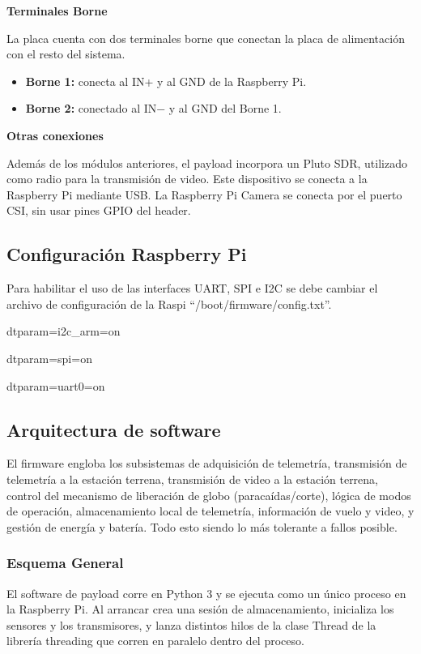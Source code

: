 \documentclass[12pt,a4paper]{article}
\begin{document}
\textbf{Terminales Borne}

La placa cuenta con dos terminales borne que conectan la placa de alimentación con el resto del sistema.

\begin{itemize}
\item
  \textbf{Borne 1:} conecta al IN+ y al GND de la Raspberry Pi.
\item
  \textbf{Borne 2:} conectado al IN− y al GND del Borne 1.
\end{itemize}

\textbf{Otras conexiones}

Además de los módulos anteriores, el payload incorpora un Pluto SDR, utilizado como radio para la transmisión de video. Este dispositivo se conecta a la Raspberry Pi mediante USB. La Raspberry Pi Camera se conecta por el puerto CSI, sin usar pines GPIO del header.

\subsection{Configuración Raspberry Pi}\label{configuraciuxf3n-raspberry-pi}

Para habilitar el uso de las interfaces UART, SPI e I2C se debe cambiar el archivo de configuración de la Raspi ``/boot/firmware/config.txt''.

dtparam=i2c\_arm=on

dtparam=spi=on

dtparam=uart0=on

\subsection{Arquitectura de software}\label{arquitectura-de-software}

El firmware engloba los subsistemas de adquisición de telemetría, transmisión de telemetría a la estación terrena, transmisión de video a la estación terrena, control del mecanismo de liberación de globo (paracaídas/corte), lógica de modos de operación, almacenamiento local de telemetría, información de vuelo y video, y gestión de energía y batería. Todo esto siendo lo más tolerante a fallos posible.

\subsubsection{Esquema General}\label{esquema-general}

El software de payload corre en Python 3 y se ejecuta como un único proceso en la Raspberry Pi. Al arrancar crea una sesión de almacenamiento, inicializa los sensores y los transmisores, y lanza distintos hilos de la clase Thread de la librería threading que corren en paralelo dentro del proceso.
\end{document}
